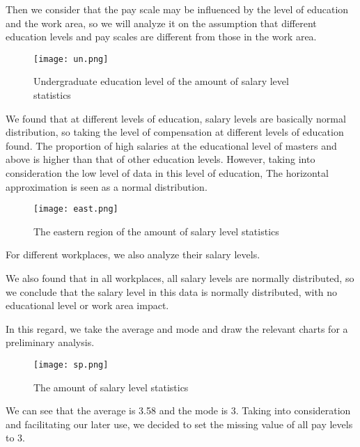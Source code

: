 \documentclass{mcmthesis}
\begin{document}
Then we consider that the pay scale may be influenced by the level of education and the work area, so we will analyze it on the assumption that different education levels and pay scales are different from those in the work area.

\begin{figure}[h]
\small
\centering
\texttt{[image: un.png]}
\caption{Undergraduate education level of the amount of salary level statistics} \label{fig:Undergraduate education level of the amount of salary level statistics}
\end{figure}

We found that at different levels of education, salary levels are basically normal distribution, so taking the level of compensation at different levels of education found. The proportion of high salaries at the educational level of masters and above is higher than that of other education levels. However, taking into consideration the low level of data in this level of education, The horizontal approximation is seen as a normal distribution.
\newpage

\begin{figure}[h]
\small
\centering
\texttt{[image: east.png]}
\caption{The eastern region of the amount of salary level statistics} \label{fig:The eastern region of the amount of salary level statistics}
\end{figure}

For different workplaces, we also analyze their salary levels.

We also found that in all workplaces, all salary levels are normally distributed, so we conclude that the salary level in this data is normally distributed, with no educational level or work area impact.

In this regard, we take the average and mode and draw the relevant charts for a preliminary analysis.

\begin{figure}[h]
\small
\centering
\texttt{[image: sp.png]}
\caption{The amount of salary level statistics} \label{fig:The amount of salary level statistics}
\end{figure}

We can see that the average is 3.58 and the mode is 3. Taking into consideration and facilitating our later use, we decided to set the missing value of all pay levels to 3.
\end{document}
